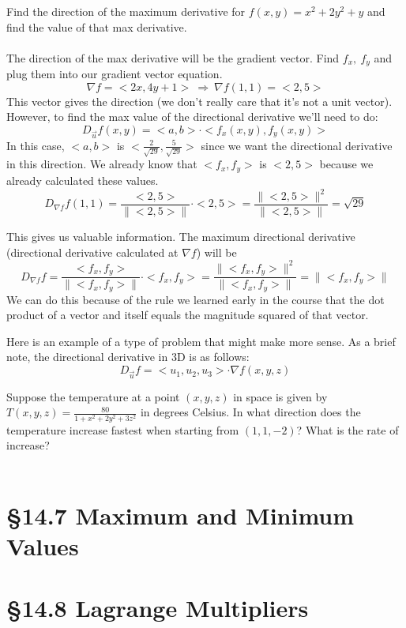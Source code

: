 \documentclass[12 pt]{article}
\begin{document}
        \begin{exmp*}
            Find the direction of the maximum derivative for $f(x,y)=x^2+2y^2+y$ and find the value of that max derivative.\\\\
            The direction of the max derivative will be the gradient vector. Find $f_x,\ f_y$ and plug them into our gradient vector equation.
            $$\nabla f=<2x,4y+1>\ \Rightarrow\ \nabla f(1,1)=<2,5>$$
            This vector gives the direction (we don't really care that it's not a unit vector). However, to find the max value of the directional derivative we'll need to do:
            $$D_{\vec{u}}f(x,y)=<a,b>\cdot<f_x(x,y),f_y(x,y)>$$
            In this case, $<a,b>$ is $<\frac{2}{\sqrt{29}},\frac{5}{\sqrt{29}}>$ since we want the directional derivative in this direction. We already know that $<f_x,f_y>$ is $<2,5>$ because we already calculated these values.
            $$D_{\nabla f}f(1,1)=\frac{<2,5>}{\parallel <2,5>\parallel}\cdot<2,5>=\frac{\parallel<2,5>\parallel^2}{\parallel<2,5>\parallel}=\sqrt{29}$$
        \end{exmp*}
        This gives us valuable information. The maximum directional derivative (directional derivative calculated at $\nabla f$) will be
        $$D_{\nabla f}f=\frac{<f_x,f_y>}{\parallel <f_x,f_y>\parallel}\cdot<f_x,f_y>=\frac{\parallel<f_x,f_y>\parallel^2}{\parallel<f_x,f_y>\parallel}=\parallel<f_x,f_y>\parallel$$
        We can do this because of the rule we learned early in the course that the dot product of a vector and itself equals the magnitude squared of that vector.

        Here is an example of a type of problem that might make more sense. As a brief note, the directional derivative in 3D is as follows:
        $$D_{\vec{u}}f=<u_1,u_2,u_3>\cdot\nabla f(x,y,z)$$
        \begin{exmp*}
            Suppose the temperature at a point $(x,y,z)$ in space is given by $T(x,y,z)=\frac{80}{1+x^2+2y^2+3z^2}$ in degrees Celsius. In what direction does the temperature increase fastest when starting from $(1,1,-2)$? What is the rate of increase?\\\\
        \end{exmp*}
    \section{\S 14.7 Maximum and Minimum Values}
    \section{\S 14.8 Lagrange Multipliers}
\end{document}
